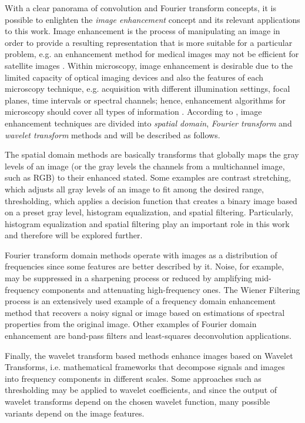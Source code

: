 With a clear panorama of convolution and Fourier transform concepts, it is possible to enlighten the \emph{image enhancement} concept and its relevant applications to this work. Image enhancement is the process of manipulating an image in order to provide a resulting representation that is more suitable for a particular problem, e.g. an enhancement method for medical images may not be efficient for satellite images \cite{gonzalez2018digital}. Within microscopy, image enhancement is desirable due to the limited capacity of optical imaging devices and also the features of each microscopy technique, e.g. acquisition with different illumination settings, focal planes, time intervals or spectral channels; hence, enhancement algorithms for microscopy should cover all types of information \cite{wu2008microscope}. According to , image enhancement techniques are divided into \emph{spatial domain}, \emph{Fourier transform} and \emph{wavelet transform} methods and will be described as follows. 

The spatial domain methods are basically transforms that globally maps the gray levels of an image (or the gray levels the channels from a multichannel image, such as RGB) to their enhanced stated. Some examples are contrast stretching, which adjusts all gray levels of an image to fit among the desired range, thresholding, which applies a decision function that creates a binary image based on a preset gray level, histogram equalization, and spatial filtering. Particularly, histogram equalization and spatial filtering play an important role in this work and therefore will be explored further.

Fourier transform domain methods operate with images as a distribution of frequencies since some features are better described by it. Noise, for example, may be suppressed in a sharpening process or reduced by amplifying mid-frequency components and attenuating high-frequency ones. The Wiener Filtering process is an extensively used example of a frequency domain enhancement method that recovers a noisy signal or image based on estimations of spectral properties from the original image. Other examples of Fourier domain enhancement are band-pass filters and least-squares deconvolution applications.

Finally, the wavelet transform based methods enhance images based on Wavelet Transforms, i.e. mathematical frameworks that decompose signals and images into frequency components in different scales. Some approaches such as thresholding may be applied to wavelet coefficients, and since the output of wavelet transforms depend on the chosen wavelet function, many possible variants depend on the image features. 

